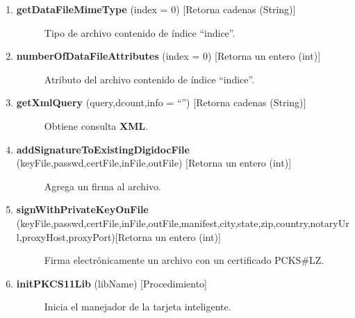 \documentclass[letterpaper,11pt,spanish]{sphinxmanual}
\begin{document}
\begin{description}
\begin{enumerate}
\begin{description}
\end{description}

\item {} \begin{description}
\item[{\textbf{getDataFileMimeType} (index = 0) {[}Retorna cadenas (String){]}}] \leavevmode
Tipo de archivo contenido de índice ``indice''.

\end{description}

\item {} \begin{description}
\item[{\textbf{numberOfDataFileAttributes} (index = 0) {[}Retorna un entero (int){]}}] \leavevmode
Atributo del archivo contenido de índice ``indice''.

\end{description}

\item {} \begin{description}
\item[{\textbf{getXmlQuery} (query,dcount,info = ``'') {[}Retorna cadenas (String){]}}] \leavevmode
Obtiene consulta \textbf{XML}.

\end{description}

\item {} \begin{description}
\item[{\textbf{addSignatureToExistingDigidocFile} (keyFile,passwd,certFile,inFile,outFile) {[}Retorna un entero (int){]}}] \leavevmode
Agrega un firma al archivo.

\end{description}

\item {} \begin{description}
\item[{\textbf{signWithPrivateKeyOnFile} (keyFile,passwd,certFile,inFile,outFile,manifest,city,state,zip,country,notaryUrl,proxyHost,proxyPort){[}Retorna un entero (int){]}}] \leavevmode
Firma electrónicamente un archivo con un certificado PCKS\#LZ.

\end{description}

\item {} \begin{description}
\item[{\textbf{initPKCS11Lib} (libName) {[}Procedimiento{]}}] \leavevmode
Inicia el manejador de la tarjeta inteligente.


\end{description}
\end{enumerate}
\end{description}
\end{document}
